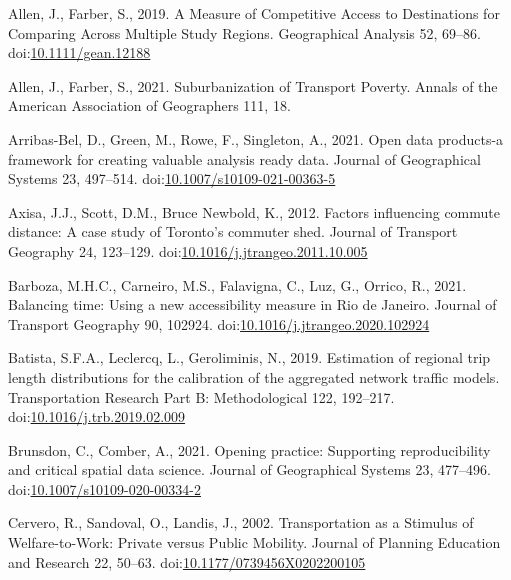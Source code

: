\documentclass[]{elsarticle} %
\newlength{\cslhangindent}
\newlength{\cslentryspacingunit} %
\newenvironment{CSLReferences}[2] %
 {%
  \setlength{\parindent}{0pt}
  \ifodd #1
  \let\oldpar\par
  \def\par{\hangindent=\cslhangindent\oldpar}
  \fi
  \setlength{\parskip}{#2\cslentryspacingunit}
 }%
 {}
\begin{document}
\hypertarget{refs}{}
\begin{CSLReferences}{1}{0}
\leavevmode{}%
Allen, J., Farber, S., 2019. A Measure of Competitive Access to
Destinations for Comparing Across Multiple Study Regions. Geographical
Analysis 52, 69--86.
doi:\href{https://doi.org/10.1111/gean.12188}{10.1111/gean.12188}

\leavevmode{}%
Allen, J., Farber, S., 2021. Suburbanization of {Transport} {Poverty}.
Annals of the American Association of Geographers 111, 18.

\leavevmode{}%
Arribas-Bel, D., Green, M., Rowe, F., Singleton, A., 2021. Open data
products-a framework for creating valuable analysis ready data. Journal
of Geographical Systems 23, 497--514.
doi:\href{https://doi.org/10.1007/s10109-021-00363-5}{10.1007/s10109-021-00363-5}

\leavevmode{}%
Axisa, J.J., Scott, D.M., Bruce Newbold, K., 2012. Factors influencing
commute distance: A case study of {Toronto}'s commuter shed. Journal of
Transport Geography 24, 123--129.
doi:\href{https://doi.org/10.1016/j.jtrangeo.2011.10.005}{10.1016/j.jtrangeo.2011.10.005}

\leavevmode{}%
Barboza, M.H.C., Carneiro, M.S., Falavigna, C., Luz, G., Orrico, R.,
2021. Balancing time: {Using} a new accessibility measure in {Rio} de
{Janeiro}. Journal of Transport Geography 90, 102924.
doi:\href{https://doi.org/10.1016/j.jtrangeo.2020.102924}{10.1016/j.jtrangeo.2020.102924}

\leavevmode{}%
Batista, S.F.A., Leclercq, L., Geroliminis, N., 2019. Estimation of
regional trip length distributions for the calibration of the aggregated
network traffic models. Transportation Research Part B: Methodological
122, 192--217.
doi:\href{https://doi.org/10.1016/j.trb.2019.02.009}{10.1016/j.trb.2019.02.009}

\leavevmode{}%
Brunsdon, C., Comber, A., 2021. Opening practice: Supporting
reproducibility and critical spatial data science. Journal of
Geographical Systems 23, 477--496.
doi:\href{https://doi.org/10.1007/s10109-020-00334-2}{10.1007/s10109-020-00334-2}

\leavevmode{}%
Cervero, R., Sandoval, O., Landis, J., 2002. Transportation as a
{Stimulus} of {Welfare}-to-{Work}: {Private} versus {Public} {Mobility}.
Journal of Planning Education and Research 22, 50--63.
doi:\href{https://doi.org/10.1177/0739456X0202200105}{10.1177/0739456X0202200105}


\end{CSLReferences}
\end{document}
